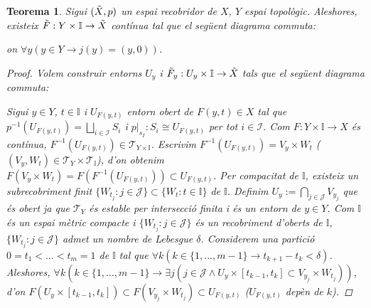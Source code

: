 \documentclass[compress,10pt]{article}
\newtheorem{teorema}{Teorema}[section]
\theoremstyle{definition}
\begin{document}
\begin{teorema}
    Sigui $(\Tilde{X},p)$ un espai recobridor de $X$, $Y$ espai topològic. Aleshores, existeix $\Tilde{F}:Y\times\mathbb{I}\rightarrow\Tilde{X}$ contínua tal que el següent diagrama commuta:
    \begin{center}
    \end{center}
    on $\forall y(y\in Y\rightarrow j(y)=(y,0))$.
    \begin{proof}
        Volem construir entorns $U_{y}$ i $\Tilde{F}_{y}:U_{y}\times\mathbb{I}\rightarrow\Tilde{X}$ tals que el següent diagrama commuta:
        \begin{center}
        \end{center}
        Sigui $y\in Y$, $t\in\mathbb{I}$ i $U_{F(y,t)}$ entorn obert de $F(y,t)\in X$ tal que $p^{-1}(U_{F(y,t)})=\bigsqcup_{i\in\mathscr{I}}S_{i}$ i $p|_{s_{I}}:S_{i}\cong U_{F(y,t)}$ per tot $i\in\mathscr{I}$. Com $F:Y\times\mathbb{I}\rightarrow X$ és contínua, $F^{-1}(U_{F(y,t)})\in\mathscr{T}_{Y\times\mathbb{I}}$. Escrivim $F^{-1}(U_{F(y,t)})=V_{y}\times W_{t}$ ($(V_{y},W_{t})\in\mathscr{T}_{Y}\times\mathscr{T}_{\mathbb{I}}$), d'on obtenim $F(V_{y}\times W_{t})=F(F^{-1}(U_{F(y,t)}))\subset U_{F(y,t)}$.\newline
        Per compacitat de $\mathbb{I}$, existeix un subrecobriment finit $\{W_{t_{j}}:j\in\mathscr{J}\}\subset\{W_{t}:t\in\mathbb{I}\}$ de $\mathbb{I}$. Definim $U_{y}:=\bigcap_{j\in\mathscr{J}}V_{y_{j}}$ que és obert ja que $\mathscr{T}_{Y}$ és estable per intersecció finita i és un entorn de $y\in Y$. Com $\mathbb{I}$ és un espai mètric compacte i $\{W_{t_{j}}:j\in\mathscr{J}\}$ és un recobriment d'oberts de $\mathbb{I}$, $\{W_{t_{j}}:j\in\mathscr{J}\}$ admet un nombre de Lebesgue $\delta$. Considerem una partició $0=t_{1}<\ldots<t_{m}=1$ de $\mathbb{I}$ tal que $\forall k(k\in\{1,\ldots,m-1\}\rightarrow t_{k+1}-t_{k}<\delta)$. Aleshores, $\forall k(k\in\{1,\ldots,m-1\}\rightarrow\exists j(j\in\mathscr{J}\land U_{y}\times[t_{k-1},t_{k}]\subset V_{y_{j}}\times W_{t_{j}}))$, d'on $F(U_{y}\times[t_{k-1},t_{k}])\subset F(V_{y_{j}}\times W_{t_{j}})\subset U_{F(y,t)}$ ($U_{F(y,t)}$ depèn de $k$).\newline

\end{proof}
\end{teorema}
\end{document}
